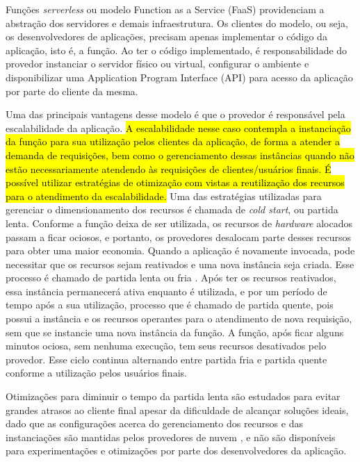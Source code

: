 \documentclass[conference]{IEEEtran}
\begin{document}
Funções \textit{serverless} ou modelo Function as a Service (FaaS) providenciam a abstração dos servidores e demais infraestrutura. Os clientes do modelo, ou seja, os desenvolvedores de aplicações, precisam apenas implementar o código da aplicação, isto é, a função. Ao ter o código implementado, é responsabilidade do provedor instanciar o servidor físico ou virtual, configurar o ambiente e disponibilizar uma Application Program Interface (API) para acesso da aplicação por parte do cliente da mesma. 

Uma das principais vantagens desse modelo é que o provedor é responsável pela escalabilidade da aplicação. \hl{A escalabilidade nesse caso contempla a instanciação da função para sua utilização pelos clientes da aplicação, de forma a atender a demanda de requisições, bem como o gerenciamento dessas instâncias quando não estão necessariamente atendendo às requisições de clientes/usuários finais. É possível utilizar estratégias de otimização com vistas a reutilização dos recursos para o atendimento da escalabilidade.}
Uma das estratégias utilizadas para gerenciar o dimensionamento dos recursos é chamada de \textit{cold start}, ou partida lenta. 
Conforme a função deixa de ser utilizada, os recursos de \textit{hardware} alocados passam a ficar ociosos, e portanto, os provedores desalocam parte desses recursos para obter uma maior economia. Quando a aplicação é novamente invocada, pode necessitar que os recursos sejam reativados e uma nova instância seja criada. Esse processo é chamado de partida lenta ou fria \cite{vahidinia_2020_cold_start}. Após ter os recursos reativados, essa instância permanecerá ativa enquanto é utilizada, e por um período de tempo após a sua utilização, processo que é chamado de partida quente, pois possui a instância e os recursos operantes \cite{Raje_2023_cold_warm_start} para o atendimento de nova requisição, sem que se instancie uma nova instância da função. A função, após ficar alguns minutos ociosa, sem nenhuma execução, tem seus recursos desativados pelo provedor. Esse ciclo continua alternando entre partida fria e partida quente conforme a utilização pelos usuários finais.

Otimizações para diminuir o tempo da partida lenta são estudados para evitar grandes atrasos ao cliente final apesar da dificuldade de alcançar soluções ideais, dado que as configurações acerca do gerenciamento dos recursos e das instanciações são mantidas pelos provedores de nuvem \cite{vahidinia_2020_cold_start, kumari_2022_mitigating_cold_start, vahidinia_2023_mitigating_cold_start, dantas_2022_reducing_cold_start}, e não são disponíveis para experimentações e otimizações por parte dos desenvolvedores da aplicação.
\end{document}
